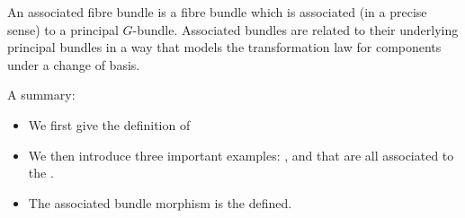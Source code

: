 \documentclass{article}
\begin{document}
An associated fibre bundle is a fibre bundle which is associated (in a precise sense) to a principal $G$-bundle. Associated bundles are related to their underlying principal bundles in a way that models the transformation law for components under a change of basis.

A summary:
\begin{itemize}[$\blacktriangleright$]
\item We first give the definition of 
\item We then introduce three important examples: ,  and   that are all associated to the .
\item The associated bundle morphism is the defined.
\end{itemize}
\end{document}
